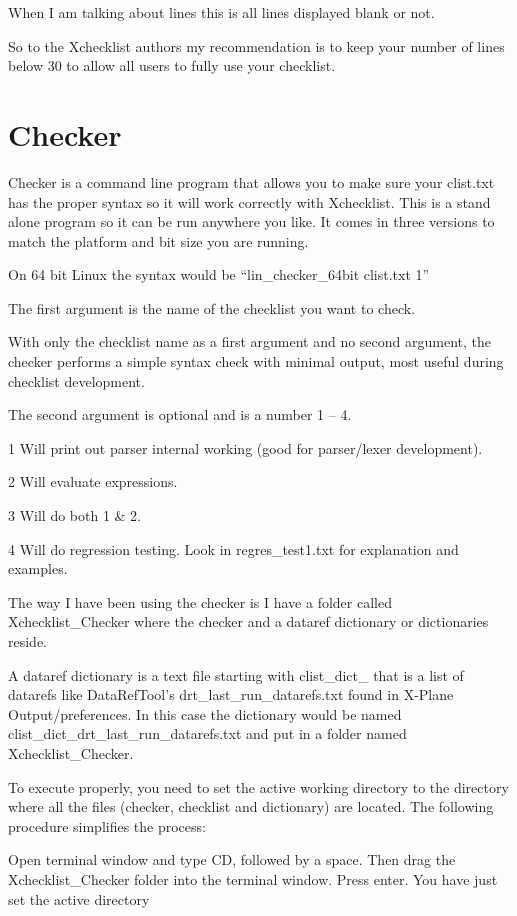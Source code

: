\documentclass[11pt,parskip=half,a4paper]{scrartcl}
\begin{document}
When I am talking about lines this is all lines displayed blank or not.

So to the Xchecklist authors my recommendation is to keep your number of lines below 30 to allow all users to fully use your checklist.

\newpage
\section{Checker}


Checker is a command line program that allows you to make sure your clist.txt has the proper syntax so it will work correctly with Xchecklist. This is a stand alone program so it can be run anywhere you like. It comes in three versions to match the platform and bit size you are running.

On 64 bit Linux the syntax would be ``lin\_checker\_64bit clist.txt 1''

The first argument is the name of the checklist you want to check.

With only the checklist name as a first argument and no second argument, the checker performs a simple syntax check with minimal output, most useful during checklist development.

The second argument is optional and is a number 1 -- 4.

1 Will print out parser internal working (good for parser/lexer development).

2 Will evaluate expressions.

3 Will do both 1 \& 2.

4 Will do regression testing. Look in regres\_test1.txt for explanation and examples.

The way I have been using the checker is I have a folder called Xchecklist\_Checker where the checker and a dataref dictionary or dictionaries reside.

A dataref dictionary is a text file starting with clist\_dict\_ that is a list of datarefs like DataRefTool's
drt\_last\_run\_datarefs.txt found in X-Plane Output/preferences. In this case the dictionary would be named
clist\_dict\_drt\_last\_run\_datarefs.txt and put in a folder named Xchecklist\_Checker.

To execute properly, you need to set the active working directory to the directory where all the files (checker,
checklist and dictionary) are located. The following procedure simplifies the process:

Open terminal window and type CD, followed by a space. Then drag the Xchecklist\_Checker folder into the terminal window. Press enter. You have just set the active directory
\end{document}
